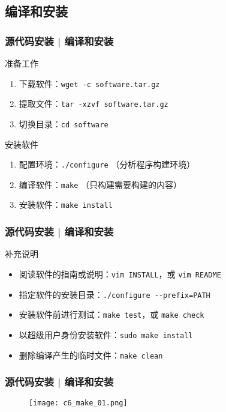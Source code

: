 \subsection{编译和安装}
\begin{frame}[fragile]
  \frametitle{源代码安装 | \alert{编译和安装}}
  \begin{block}{准备工作}
    \begin{enumerate}
      \item 下载软件：\verb|wget -c software.tar.gz|
      \item 提取文件：\verb|tar -xzvf software.tar.gz|
      \item 切换目录：\verb|cd software|
    \end{enumerate}
  \end{block}
  \pause
  \begin{block}{安装软件}
    \begin{enumerate}
      \item 配置环境：\verb|./configure| （分析程序构建环境）
      \item 编译软件：\verb|make| （只构建需要构建的内容）
      \item 安装软件：\verb|make install|
    \end{enumerate}
  \end{block}
\end{frame}

\begin{frame}[fragile]
  \frametitle{源代码安装 | 编译和安装}
  \begin{block}{补充说明}
    \begin{itemize}
      \item 阅读软件的指南或说明：\verb|vim INSTALL|，或 \verb|vim README|
      \item 指定软件的安装目录：\verb|./configure --prefix=PATH|
      \item 安装软件前进行测试：\verb|make test|，或 \verb|make check|
      \item 以超级用户身份安装软件：\verb|sudo make install|
      \item 删除编译产生的临时文件：\verb|make clean|
    \end{itemize}
  \end{block}
\end{frame}

\begin{frame}
  \frametitle{源代码安装 | 编译和安装}
  \begin{figure}
    \centering
    \texttt{[image: c6\_make\_01.png]}
  \end{figure}
\end{frame}


